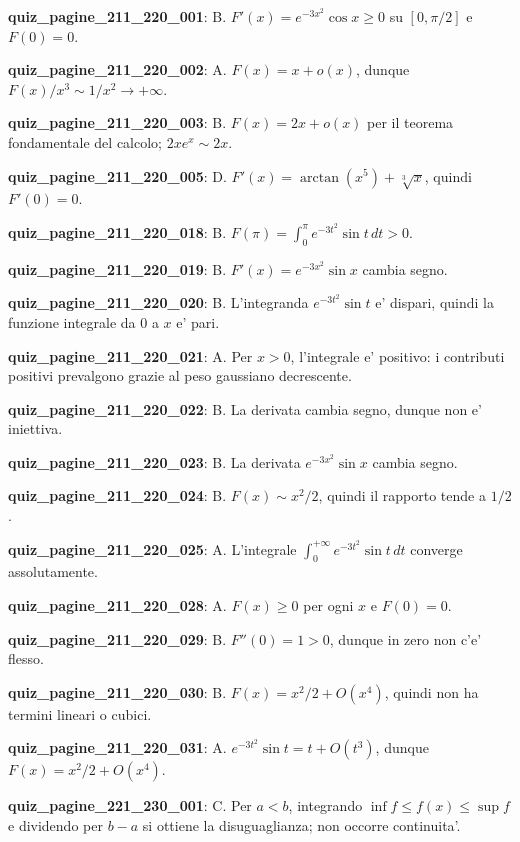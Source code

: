 \documentclass[11pt,a4paper]{article}
\newcounter{quiz}
\begin{document}
\noindent\textbf{quiz\_pagine\_211\_220\_001}: B. $F'(x)=e^{-3x^2}\cos x\geq0$ su $[0,\pi/2]$ e $F(0)=0$.\par\medskip
\noindent\textbf{quiz\_pagine\_211\_220\_002}: A. $F(x)=x+o(x)$, dunque $F(x)/x^3\sim1/x^2\to+\infty$.\par\medskip
\noindent\textbf{quiz\_pagine\_211\_220\_003}: B. $F(x)=2x+o(x)$ per il teorema fondamentale del calcolo; $2xe^x\sim2x$.\par\medskip
\noindent\textbf{quiz\_pagine\_211\_220\_005}: D. $F'(x)=\arctan(x^5)+\sqrt[3]x$, quindi $F'(0)=0$.\par\medskip
\noindent\textbf{quiz\_pagine\_211\_220\_018}: B. $F(\pi)=\int_0^\pi e^{-3t^2}\sin t\,dt>0$.\par\medskip
\noindent\textbf{quiz\_pagine\_211\_220\_019}: B. $F'(x)=e^{-3x^2}\sin x$ cambia segno.\par\medskip
\noindent\textbf{quiz\_pagine\_211\_220\_020}: B. L'integranda $e^{-3t^2}\sin t$ e' dispari, quindi la funzione integrale da $0$ a $x$ e' pari.\par\medskip
\noindent\textbf{quiz\_pagine\_211\_220\_021}: A. Per $x>0$, l'integrale e' positivo: i contributi positivi prevalgono grazie al peso gaussiano decrescente.\par\medskip
\noindent\textbf{quiz\_pagine\_211\_220\_022}: B. La derivata cambia segno, dunque non e' iniettiva.\par\medskip
\noindent\textbf{quiz\_pagine\_211\_220\_023}: B. La derivata $e^{-3x^2}\sin x$ cambia segno.\par\medskip
\noindent\textbf{quiz\_pagine\_211\_220\_024}: B. $F(x)\sim x^2/2$, quindi il rapporto tende a $1/2$.\par\medskip
\noindent\textbf{quiz\_pagine\_211\_220\_025}: A. L'integrale $\int_0^{+\infty}e^{-3t^2}\sin t\,dt$ converge assolutamente.\par\medskip
\noindent\textbf{quiz\_pagine\_211\_220\_028}: A. $F(x)\geq0$ per ogni $x$ e $F(0)=0$.\par\medskip
\noindent\textbf{quiz\_pagine\_211\_220\_029}: B. $F''(0)=1>0$, dunque in zero non c'e' flesso.\par\medskip
\noindent\textbf{quiz\_pagine\_211\_220\_030}: B. $F(x)=x^2/2+O(x^4)$, quindi non ha termini lineari o cubici.\par\medskip
\noindent\textbf{quiz\_pagine\_211\_220\_031}: A. $e^{-3t^2}\sin t=t+O(t^3)$, dunque $F(x)=x^2/2+O(x^4)$.\par\medskip
\noindent\textbf{quiz\_pagine\_221\_230\_001}: C. Per $a<b$, integrando $\inf f\leq f(x)\leq\sup f$ e dividendo per $b-a$ si ottiene la disuguaglianza; non occorre continuita'.\par\medskip
\end{document}
